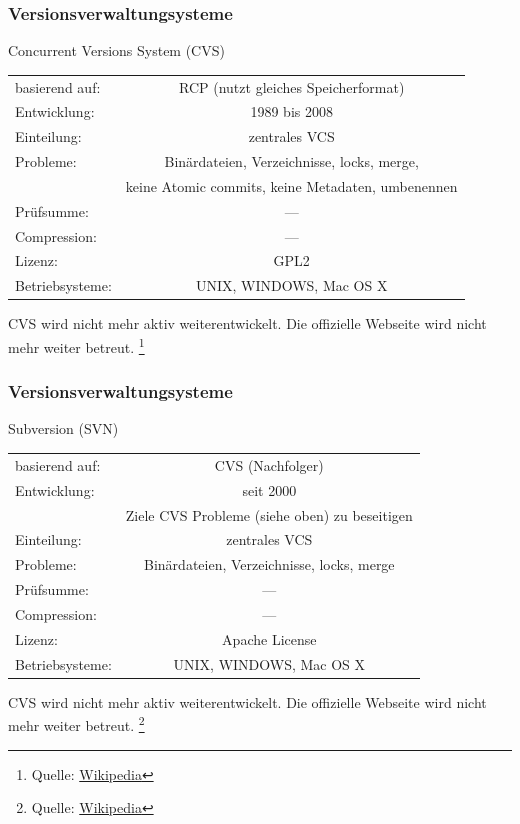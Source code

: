 \documentclass{beamer}
\begin{document}
\begin{frame}\frametitle{Versionsverwaltungsysteme} 

\begin{block}{Concurrent Versions System (CVS)}
	\begin{tabular}{l c}
basierend auf: & RCP (nutzt gleiches Speicherformat) \\ 
Entwicklung: & 1989 bis 2008  \\  
Einteilung: & zentrales VCS \\ 
Probleme: & Binärdateien, Verzeichnisse, locks, merge, \\
          & keine Atomic commits, keine Metadaten, umbenennen  \\
Prüfsumme: & --- \\
Compression: & --- \\
Lizenz: & GPL2 \\
Betriebsysteme: & UNIX, WINDOWS, Mac OS X \\
\end{tabular} 

\vspace*{0.3cm}
CVS wird nicht mehr aktiv weiterentwickelt. Die offizielle Webseite wird nicht mehr weiter betreut. \footnote{Quelle: \href{http://de.wikipedia.org/wiki/Concurrent_Versions_System}{Wikipedia}}
\end{block}


\end{frame}

\begin{frame}\frametitle{Versionsverwaltungsysteme} 

\begin{block}{Subversion (SVN)}
	\begin{tabular}{l c}
basierend auf: & CVS (Nachfolger) \\ 
Entwicklung: & seit 2000  \\  
 & Ziele CVS Probleme (siehe oben) zu beseitigen \\
Einteilung: & zentrales VCS \\ 
Probleme: & Binärdateien, Verzeichnisse, locks, merge \\
Prüfsumme: & --- \\
Compression: & --- \\
Lizenz: & Apache License \\
Betriebsysteme: & UNIX, WINDOWS, Mac OS X \\
\end{tabular} 

\vspace*{0.3cm}
CVS wird nicht mehr aktiv weiterentwickelt. Die offizielle Webseite wird nicht mehr weiter betreut. \footnote{Quelle: \href{http://de.wikipedia.org/wiki/Concurrent_Versions_System}{Wikipedia}}
\end{block}


\end{frame}
\end{document}
